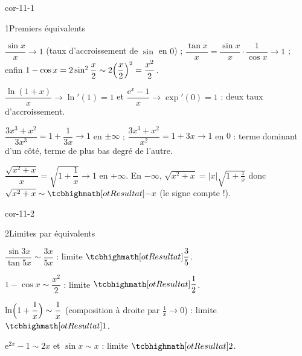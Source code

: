
\corrigesSouples

\begin{blocLivre}{cor-11-1}
\begin{corrige}{1}{Premiers équivalents}
\begin{questions}
  \item $\dfrac{\sin x}{x}\to1$ (taux d'accroissement de $\sin$ en $0$) ;
    $\dfrac{\tan x}{x}=\dfrac{\sin x}{x}\cdot\dfrac{1}{\cos x}\to1$ ;
    enfin $1-\cos x=2\sin^{2}\dfrac{x}{2}\sim2\Bigl(\dfrac{x}{2}\Bigr)^{2}
    =\dfrac{x^{2}}{2}$.
  \item $\dfrac{\ln(1+x)}{x}\to\ln'(1)=1$ et
    $\dfrac{\mathrm{e}^{x}-1}{x}\to\exp'(0)=1$ : deux taux d'accroissement.
  \item $\dfrac{3x^{3}+x^{2}}{3x^{3}}=1+\dfrac{1}{3x}\to1$ en $\pm\infty$ ;
    $\dfrac{3x^{3}+x^{2}}{x^{2}}=1+3x\to1$ en $0$ : terme dominant d'un
    côté, terme de plus bas degré de l'autre.
  \item $\dfrac{\sqrt{x^{2}+x}}{x}=\sqrt{1+\dfrac1x}\to1$ en $+\infty$.
    En $-\infty$, $\sqrt{x^{2}+x}=\lvert x\rvert\sqrt{1+\tfrac1x}$ donc
    $\sqrt{x^{2}+x}\sim\res{-x}$ (le signe compte !).
\end{questions}
\end{corrige}
\end{blocLivre}

\begin{blocLivre}{cor-11-2}
\begin{corrige}{2}{Limites par équivalents}
\begin{questions}
  \item $\dfrac{\sin3x}{\tan5x}\sim\dfrac{3x}{5x}$ :
    limite $\res{\dfrac35}$.
  \item $1-\cos x\sim\dfrac{x^{2}}{2}$ : limite $\res{\dfrac12}$.
  \item $\ln\Bigl(1+\dfrac1x\Bigr)\sim\dfrac1x$ (composition à droite par
    $\tfrac1x\to0$) : limite $\res{1}$.
  \item $\mathrm{e}^{2x}-1\sim2x$ et $\sin x\sim x$ :
    limite $\res{2}$.
\end{questions}
\end{corrige}
\end{blocLivre}

